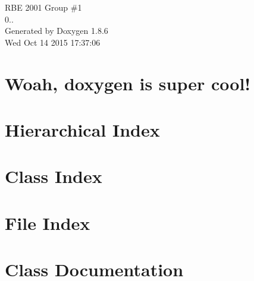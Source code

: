 \documentclass[twoside]{book}
\newcommand{\clearemptydoublepage}{%
  \newpage{\pagestyle{empty}\cleardoublepage}%
}
\begin{document}
\hypersetup{pageanchor=false}
\begin{titlepage}
\vspace*{7cm}
\begin{center}%
{\Large R\-B\-E 2001 Group \#1 \\[1ex]\large 0.. }\\
\vspace*{1cm}
{\large Generated by Doxygen 1.8.6}\\
\vspace*{0.5cm}
{\small Wed Oct 14 2015 17:37:06}\\
\end{center}
\end{titlepage}
\clearemptydoublepage
\tableofcontents
\clearemptydoublepage
{}
\hypersetup{pageanchor=true}

\chapter{Woah, doxygen is super cool!}
\label{index}\hypertarget{index}{}
\chapter{Hierarchical Index}

\chapter{Class Index}

\chapter{File Index}

\chapter{Class Documentation}

































\end{document}
